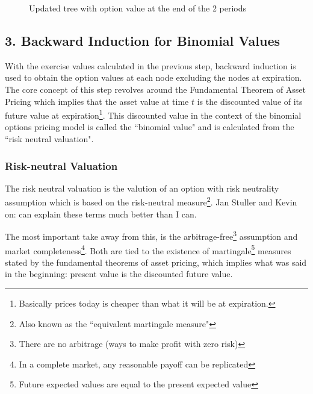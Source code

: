 \documentclass[12pt, letterpaper]{article}\usepackage{float}
\begin{document}
\begin{figure}[H]
  \caption{Updated tree with option value at the end of the 2 periods}
\end{figure}

\pagebreak
\subsection*{3. Backward Induction for Binomial Values}
With the exercise values calculated in the previous step, backward induction is used to obtain the option values at each node excluding the nodes at expiration.
The core concept of this step revolves around the Fundamental Theorem of Asset Pricing which implies that the asset value at time ${t}$ is the discounted value of its future value at expiration\footnote{Basically prices today is cheaper than what it will be at expiration.}\cite{blythevideo}\cite{ftapwikipedia}.
This discounted value in the context of the binomial options pricing model is called the ``binomial value" and is calculated from the ``risk neutral valuation".

\subsubsection*{Risk-neutral Valuation}
The risk neutral valuation is the valution of an option with risk neutrality assumption\cite{riskneutralvalutionwikipedia} which is based on the risk-neutral measure\footnote{Also known as the ``equivalent martingale measure"}\cite{riskneutralmeasurewikipedia}.
Jan Stuller and Kevin on: \href{https://quant.stackexchange.com/questions/55239/what-is-the-risk-neutral-measure}{\color{blue}{quant.stackexchange}} can explain these terms much better than I can.

\medskip

The most important take away from this, is the arbitrage-free\footnote{There are no arbitrage (ways to make profit with zero risk)} assumption and market completeness\footnote{In a complete market, any reasonable payoff can be replicated\cite{riskneutralmeasurestackexchange}}.
Both are tied to the existence of martingale\footnote{Future expected values are equal to the present expected value} measures stated by the fundamental theorems of asset pricing\cite{ftapwikipedia}, which implies what was said in the beginning: present value is the discounted future value.
\end{document}
